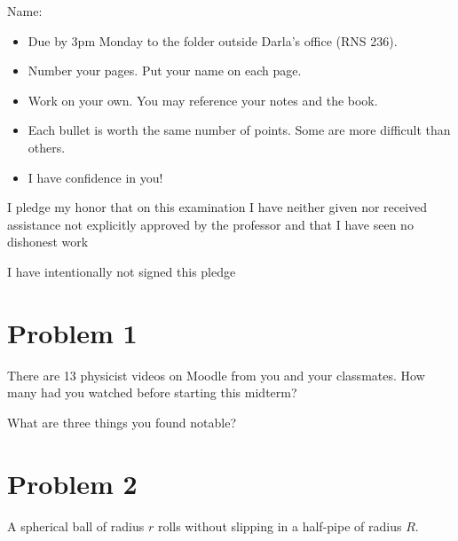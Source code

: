 \documentclass{article}
\newcommand{\purple}[1]{{\color{purple} #1}}
\begin{document}
Name: \makebox[2in]{\hrulefill\purple{SOLUTION}\hrulefill}

\vspace{0.5in}

\begin{itemize}
    \item Due by 3pm Monday to the folder outside Darla's office (RNS 236).
    \item Number your pages. Put your name on each page.
    \item Work on your own. You may reference your notes and the book. 
    \item Each bullet is worth the same number of points. Some are more difficult than others.
    \item I have confidence in you!
\end{itemize}

\vfill

I pledge my honor that on this examination I have neither given nor received assistance not explicitly approved by the professor and that I have seen no dishonest work \makebox[2in]{\hrulefill}

\vspace{0.5in}

I have intentionally not signed this pledge \makebox[2in]{\hrulefill}

\newpage

\section*{Problem 1}

There are 13 physicist videos on Moodle from you and your classmates. How many had you watched before starting this midterm?

What are three things you found notable?

\newpage

\section*{Problem 2}

A spherical ball of radius $r$ rolls without slipping in a half-pipe of radius $R$.
\end{document}

